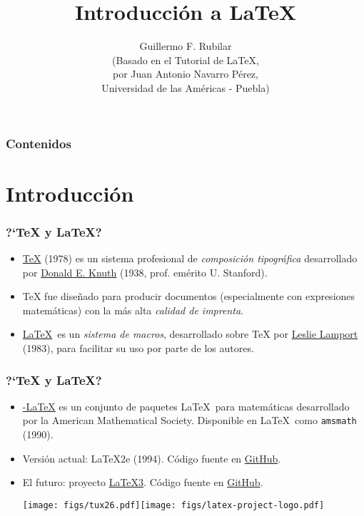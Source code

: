 \documentclass[hyperref={colorlinks},aspectratio=169]{beamer}
\begin{document}
\title[\LaTeX]{Introducción a \LaTeX}
\author[G.R.]{{Guillermo F. Rubilar} \\ \tiny (Basado en el Tutorial de \LaTeX ,\\
por Juan Antonio Navarro Pérez, \\Universidad de las Américas - Puebla)}
\frame{\titlepage}


\begin{frame}
\frametitle{Contenidos}
\tableofcontents
\end{frame}


\section{Introducción}
\begin{frame}[fragile]\frametitle{?`\TeX{} y \LaTeX?}
\begin{itemize}
\item \href{https://es.wikipedia.org/wiki/TeX}{\TeX{}} (1978) es un sistema profesional de \emph{composición tipográfica} desarrollado
por \href{https://es.wikipedia.org/wiki/Donald_Knuth}{Donald E. Knuth} (1938, prof. emérito U. Stanford).
\item \TeX{} fue dise\~nado para producir documentos (especialmente con expresiones matemáticas) con la más alta \emph{calidad de imprenta}.
\item \href{https://es.wikipedia.org/wiki/LaTeX}{\LaTeX}\ es un \emph{sistema de macros}, desarrollado sobre \TeX{} por \href{https://es.wikipedia.org/wiki/Leslie_Lamport}{Leslie Lamport} (1983), para facilitar su uso por parte de los autores.
\end{itemize}
\end{frame}

\begin{frame}[fragile]\frametitle{?`\TeX{} y \LaTeX?}
\begin{itemize}
\item \href{https://es.wikipedia.org/wiki/AMS-LaTeX}{\AmS -\LaTeX} es un conjunto de paquetes \LaTeX\ para matemáticas desarrollado por la American Mathematical Society. Disponible en \LaTeX\ como \texttt{amsmath} 
(1990).
  \item Versión actual: \LaTeX2e (1994). Código fuente en \href{https://github.com/latex3/latex2e}{GitHub}.
  \item El futuro: proyecto \href{https://www.latex-project.org/latex3/}{\LaTeX3}. Código fuente en \href{https://github.com/latex3/latex3}{GitHub}.
	\begin{center}
		\texttt{[image: figs/tux26.pdf]}\texttt{[image: figs/latex-project-logo.pdf]}
	\end{center}
\end{itemize}
\end{frame}
\end{document}
